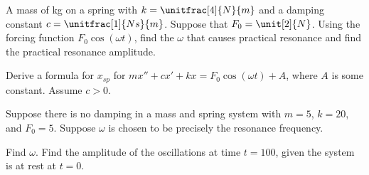\setcounter{exercise}{100}

\begin{exercise}
A mass of \unit[4]{kg} on a spring with $k=\unitfrac[4]{N}{m}$ and a damping
constant $c=\unitfrac[1]{Ns}{m}$.
Suppose that $F_0 = \unit[2]{N}$.
Using the forcing function $F_0 \cos (\omega t)$,
find the $\omega$ that causes practical resonance and find the
practical resonance amplitude.
\end{exercise}

\begin{exercise}
Derive a formula for $x_{sp}$ for
$mx''+cx'+kx = F_0 \cos(\omega t) + A$,
where $A$ is some constant.  Assume $c > 0$.
\end{exercise}

\begin{exercise}
Suppose there is no damping in a mass and spring system with
$m = 5$, $k= 20$, and $F_0 = 5$.  Suppose $\omega$ is chosen
to be precisely the resonance frequency.
\begin{tasks}
\task
Find $\omega$.
\task
Find the amplitude of the oscillations at time $t=100$, given the system is at
rest at $t=0$.
\end{tasks}
\end{exercise}
